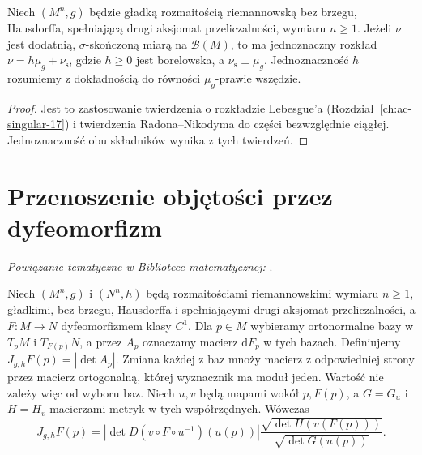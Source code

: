 \begin{twierdzenie}
\label{thm:leb-manifold-27}
Niech $(M^n,g)$ będzie gładką rozmaitością riemannowską
bez brzegu, Hausdorffa, spełniającą drugi aksjomat przeliczalności,
wymiaru $n\ge1$. Jeżeli $\nu$ jest dodatnią, $\sigma$-skończoną
miarą na $\mathcal B(M)$, to ma jednoznaczny rozkład
$\nu=h\mu_g+\nu_{\mathrm s}$, gdzie
$h\ge0$ jest borelowska, a
$\nu_{\mathrm s}\perp\mu_g$. Jednoznaczność $h$ rozumiemy
z dokładnością do równości $\mu_g$-prawie wszędzie.
\end{twierdzenie}
\begin{proof}
Jest to zastosowanie twierdzenia o rozkładzie
Lebesgue'a (Rozdział~\ref{ch:ac-singular-17})
i twierdzenia Radona--Nikodyma do części
bezwzględnie ciągłej. Jednoznaczność obu składników
wynika z tych twierdzeń.
\end{proof}

\section{Przenoszenie objętości przez dyfeomorfizm}

\noindent\emph{Powiązanie tematyczne w Bibliotece matematycznej:} .

\begin{definicja}
\label{def:volume-jacobian-27}
Niech $(M^n,g)$ i $(N^n,h)$ będą rozmaitościami
riemannowskimi wymiaru $n\ge1$, gładkimi, bez brzegu,
Hausdorffa i spełniającymi drugi aksjomat przeliczalności,
a $F:M\to N$ dyfeomorfizmem klasy $C^1$.
Dla $p\in M$ wybieramy ortonormalne bazy
w $T_pM$ i $T_{F(p)}N$, a przez $A_p$ oznaczamy
macierz $\mathrm dF_p$ w tych bazach. Definiujemy
$J_{g,h}F(p)=|\det A_p|$. Zmiana każdej z baz mnoży macierz z odpowiedniej strony
przez macierz ortogonalną, której wyznacznik ma moduł jeden.
Wartość nie zależy więc od wyboru baz.
Niech $u,v$ będą mapami wokół $p,F(p)$, a $G=G_u$ i $H=H_v$
macierzami metryk w tych współrzędnych. Wówczas
\[
 J_{g,h}F(p)=|\det D(v\circ F\circ u^{-1})(u(p))|
 \frac{\sqrt{\det H(v(F(p)))}}{\sqrt{\det G(u(p))}}.
\]
\end{definicja}

